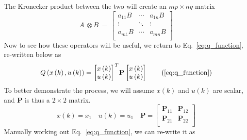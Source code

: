 The Kronecker product between the two will create an $mp \times nq$ matrix
\begin{equation}
    A\ \otimes B\ =\ \left[\begin{matrix}a_{11}B&\cdots&a_{1n}B\\\vdots&\ddots&\vdots\\a_{m1}B&\cdots&a_{mn}B\\\end{matrix}\right]
\end{equation}
Now to see how these operators will be useful, we return to Eq.~\ref{eq:q_function}, re-written below as
\begin{gather}
    Q\left(x\left(k\right),u\left(k\right)\right)={\left[\begin{matrix}x\left(k\right)\\u\left(k\right)\\\end{matrix}\right]}^T\textbf{P}\left[\begin{matrix}x\left(k\right)\\u\left(k\right)\\\end{matrix}\right] \tag{\ref{eq:q_function}}
\end{gather}
To better demonstrate the process, we will assume $x\left(k\right)$ and $u\left(k\right)$ are scalar, and \textbf{P} is thus a $2\times 2$ matrix. 
\begin{equation}
    {x}\left(k\right)=x_1
    \quad
    u\left(k\right)=u_1
    \quad
    \textbf{P}=\left[\begin{matrix}\textbf{P}_{11}&\textbf{P}_{12}\\\textbf{P}_{21}&\textbf{P}_{22}\\\end{matrix}\right]
\end{equation}
Manually working out Eq.~\ref{eq:q_function}, we can re-write it as
